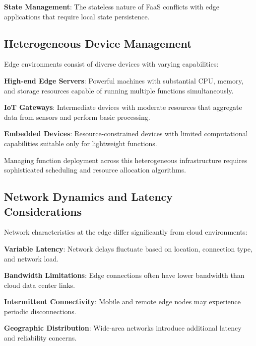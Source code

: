 \textbf{State Management}: The stateless nature of FaaS conflicts with edge applications that require local state persistence.

\subsection{Heterogeneous Device Management}

Edge environments consist of diverse devices with varying capabilities:

\textbf{High-end Edge Servers}: Powerful machines with substantial CPU, memory, and storage resources capable of running multiple functions simultaneously.

\textbf{IoT Gateways}: Intermediate devices with moderate resources that aggregate data from sensors and perform basic processing.

\textbf{Embedded Devices}: Resource-constrained devices with limited computational capabilities suitable only for lightweight functions.

Managing function deployment across this heterogeneous infrastructure requires sophisticated scheduling and resource allocation algorithms.

\subsection{Network Dynamics and Latency Considerations}

Network characteristics at the edge differ significantly from cloud environments:

\textbf{Variable Latency}: Network delays fluctuate based on location, connection type, and network load.

\textbf{Bandwidth Limitations}: Edge connections often have lower bandwidth than cloud data center links.

\textbf{Intermittent Connectivity}: Mobile and remote edge nodes may experience periodic disconnections.

\textbf{Geographic Distribution}: Wide-area networks introduce additional latency and reliability concerns.



